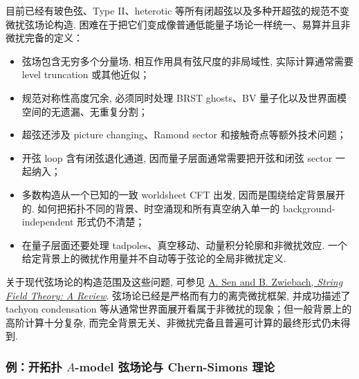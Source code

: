 \documentclass[10pt]{article}
\newcounter{ex}[section]\setcounter{ex}{0}
\numberwithin{equation}{section}
\begin{document}
目前已经有玻色弦、Type II、heterotic 等所有闭超弦以及多种开超弦的规范不变微扰弦场论构造. 困难在于把它们变成像普通低能量子场论一样统一、易算并且非微扰完备的定义：
\begin{itemize}
\item 弦场包含无穷多个分量场, 相互作用具有弦尺度的非局域性, 实际计算通常需要 level truncation 或其他近似；
\item 规范对称性高度冗余, 必须同时处理 BRST ghosts、BV 量子化以及世界面模空间的无遗漏、无重复分割；
\item 超弦还涉及 picture changing、Ramond sector 和接触奇点等额外技术问题；
\item 开弦 loop 含有闭弦退化通道, 因而量子层面通常需要把开弦和闭弦 sector 一起纳入；
\item 多数构造从一个已知的一致 worldsheet CFT 出发, 因而是围绕给定背景展开的. 如何把拓扑不同的背景、时空涌现和所有真空纳入单一的 background-independent 形式仍不清楚；
\item 在量子层面还要处理 tadpoles、真空移动、动量积分轮廓和非微扰效应. 一个给定背景上的微扰作用量并不自动等于弦论的全局非微扰定义.
\end{itemize}
关于现代弦场论的构造范围及这些问题, 可参见 \href{https://arxiv.org/abs/2405.19421}{A. Sen and B. Zwiebach, \textit{String Field Theory: A Review}}. 弦场论已经是严格而有力的离壳微扰框架, 并成功描述了 tachyon condensation 等从通常世界面展开看属于非微扰的现象；但一般背景上的高阶计算十分复杂, 而完全背景无关、非微扰完备且普遍可计算的最终形式仍未得到.

\subsubsection*{例：开拓扑 $A$-model 弦场论与 Chern-Simons 理论}
\end{document}
